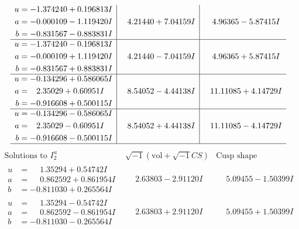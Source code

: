 \documentclass[1p]{elsarticle_modified}
\theoremstyle{definition}
\newcommand{\I}{\sqrt{-1}}
\begin{document}
$$\begin{array}{c|c|c}
\begin{aligned}
u &= -1.374240 + 0.196813 I \\
a &= -0.000109 - 1.119420 I \\
b &= -0.831567 - 0.883831 I\end{aligned}
 & \phantom{-}4.21440 + 7.04159 I & \phantom{-}4.96365 - 5.87415 I \\ \hline\begin{aligned}
u &= -1.374240 - 0.196813 I \\
a &= -0.000109 + 1.119420 I \\
b &= -0.831567 + 0.883831 I\end{aligned}
 & \phantom{-}4.21440 - 7.04159 I & \phantom{-}4.96365 + 5.87415 I \\ \hline\begin{aligned}
u &= -0.134296 + 0.586065 I \\
a &= \phantom{-}2.35029 + 0.60951 I \\
b &= -0.916608 + 0.500115 I\end{aligned}
 & \phantom{-}8.54052 - 4.44138 I & \phantom{-}11.11085 + 4.14729 I \\ \hline\begin{aligned}
u &= -0.134296 - 0.586065 I \\
a &= \phantom{-}2.35029 - 0.60951 I \\
b &= -0.916608 - 0.500115 I\end{aligned}
 & \phantom{-}8.54052 + 4.44138 I & \phantom{-}11.11085 - 4.14729 I\\
 \hline 
 \end{array}$$\newpage$$\begin{array}{c|c|c}  
\text{Solutions to }I^u_{2}& \I (\text{vol} + \sqrt{-1}CS) & \text{Cusp shape}\\
 \hline 
\begin{aligned}
u &= \phantom{-}1.35294 + 0.54742 I \\
a &= \phantom{-}0.862592 + 0.861954 I \\
b &= -0.811030 + 0.265564 I\end{aligned}
 & \phantom{-}2.63803 - 2.91120 I & \phantom{-}5.09455 - 1.50399 I \\ \hline\begin{aligned}
u &= \phantom{-}1.35294 - 0.54742 I \\
a &= \phantom{-}0.862592 - 0.861954 I \\
b &= -0.811030 - 0.265564 I\end{aligned}
 & \phantom{-}2.63803 + 2.91120 I & \phantom{-}5.09455 + 1.50399 I \\ \hline\begin{aligned}

\end{aligned}
\end{array}$$
\end{document}
